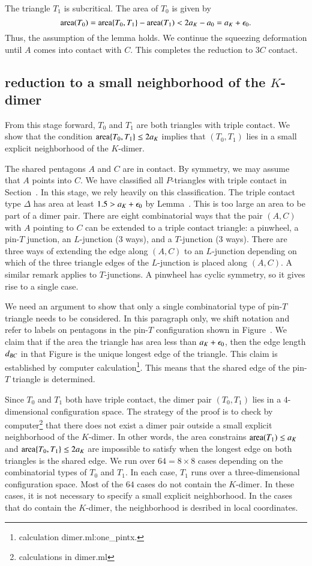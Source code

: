 The triangle $T_1$ is subcritical.  The area of $T_0$ is given by
\[
{\operatorname{area}}(T_0) = {\operatorname{area}}\{T_0,T_1\} - {\operatorname{area}}(T_1) < 2a_K - a_0 = a_K+\epsilon_0.
\]
Thus, the assumption of the lemma holds.
We continue the squeezing deformation until $A$ comes into contact with $C$.
This completes the reduction to $3C$ contact.


\subsection{reduction to a small neighborhood of the $K$-dimer}\label{sec:nbd}

From this stage forward, $T_0$ and $T_1$ are both triangles with triple contact.
We show that the condition ${\operatorname{area}}\{T_0,T_1\}\le 2a_K$ implies that
$(T_0,T_1)$ lies in a small explicit neighborhood of the $K$-dimer.

The shared pentagons $A$ and $C$ are in contact.  By symmetry, we may assume that $A$ points into $C$.
We have classified all $P$-triangles with triple contact in Section~.  In this stage, we rely heavily
on this classification.   The triple contact type $\Delta$ has area at least $1.5 > a_K+\epsilon_0$ by Lemma~.
This is too large an area to be part of a dimer pair.   There are eight combinatorial ways that the pair $(A,C)$ with $A$ pointing
to $C$ can be extended to a  triple contact triangle: a pinwheel, a pin-$T$ junction, an $L$-junction (3 ways), and a $T$-junction (3 ways).
There are three ways of extending the edge along $(A,C)$ to an $L$-junction depending on which of the three triangle edges of the $L$-junction
is placed along $(A,C)$.  A similar remark applies to $T$-junctions.  A pinwheel has cyclic symmetry, so it gives rise to a single case.

We need an argument to show that only a single combinatorial type of pin-$T$ triangle needs to be considered.  
In this paragraph only, we shift notation and refer
to labels on pentagons in the pin-$T$ configuration shown in Figure~.  We claim that if the area the triangle has area less than
$a_K+\epsilon_0$, then the edge length $d_{BC}$ in that Figure is the unique longest edge of the triangle.   
This claim is established by computer calculation\footnote{calculation dimer.ml:one\_pintx.}.  
This means that the shared edge of the pin-$T$ triangle is determined.

Since $T_0$ and $T_1$ both have triple contact, the dimer pair $(T_0,T_1)$ lies in a $4$-dimensional configuration space.
The strategy of the proof is to check by computer\footnote{calculations in dimer.ml} 
that there does not exist a  dimer pair outside a small explicit neighborhood
of the $K$-dimer.  In other words, the area constrains ${\operatorname{area}}(T_1)\le a_K$ and ${\operatorname{area}}\{T_0,T_1\}\le2a_K$ are
impossible to satisfy when the longest edge on both triangles is the shared edge.  
We run over $64 = 8\times 8$ cases depending on the combinatorial types of $T_0$ and $T_1$.  In each case,
$T_1$ runs over a three-dimensional configuration space.  Most of the $64$ cases do not contain the $K$-dimer.
In these cases, it is not necessary to specify a small explicit neighborhood.  In the cases that do contain the $K$-dimer,
the neighborhood is desribed in local coordinates.

